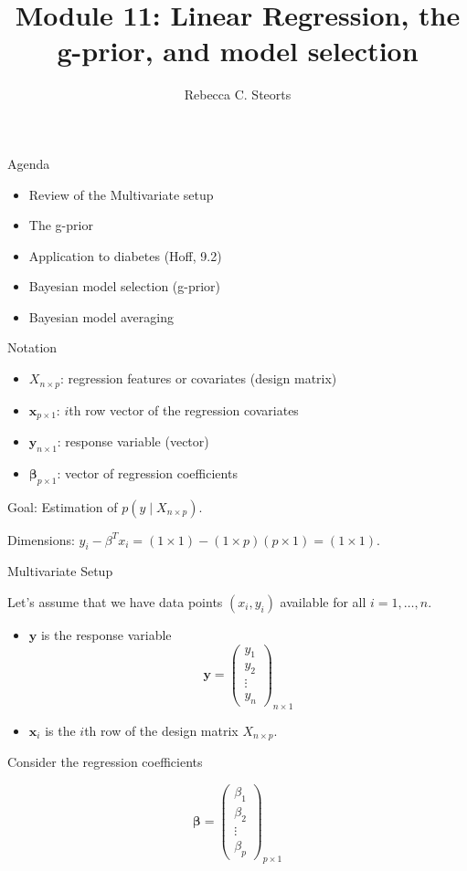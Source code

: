 \documentclass[ignorenonframetext,]{beamer}
\title{Module 11: Linear Regression, the g-prior, and model selection}
\author{Rebecca C. Steorts}
\date{}
\providecommand{\tightlist}{%
  \setlength{\itemsep}{0pt}\setlength{\parskip}{0pt}}
\newcommand{\bbeta}{\bm{\beta}}
\newcommand{\by}   {\bm{y}}
\newcommand{\bx}{\ensuremath{\mathbf{x}}}
\begin{document}
\frame{\titlepage}

\begin{frame}{Agenda}

\begin{itemize}
\tightlist
\item
  Review of the Multivariate setup
\item
  The g-prior
\item
  Application to diabetes (Hoff, 9.2)
\item
  Bayesian model selection (g-prior)
\item
  Bayesian model averaging
\end{itemize}

\end{frame}

\begin{frame}{Notation}

\begin{itemize}
\tightlist
\item
  \(X_{n\times p}\): regression features or covariates (design matrix)
\item
  \(\bx_{p \times 1}\): \(i\)th row vector of the regression covariates
\item
  \(\by_{n\times 1}\): response variable (vector)
\item
  \(\bbeta_{p \times 1}\): vector of regression coefficients
\end{itemize}

Goal: Estimation of \(p(y \mid X_{n \times p}).\)

Dimensions:
\(y_i - \beta^T x_i = (1\times 1) - (1\times p)(p \times 1) = (1\times 1).\)

\end{frame}

\begin{frame}{Multivariate Setup}

Let's assume that we have data points \((x_i,y_i)\) available for all
\(i=1,\ldots,n.\)

\begin{itemize}
\tightlist
\item
  \(\by\) is the response variable \[  \by= \left( \begin{array}{c}
  y_1\\
  y_2\\
  \vdots\\
  y_n
  \end{array} \right)_{n \times 1} \]
\item
  \(\bx_{i}\) is the \(i\)th row of the design matrix
  \(X_{n \times p}.\)
\end{itemize}

Consider the regression coefficients

\[  \bbeta = \left( \begin{array}{c}
\beta_{1}\\
\beta_{2}\\
\vdots\\
\beta_{p}
\end{array} \right)_{p \times 1} \]

\end{frame}
\end{document}
